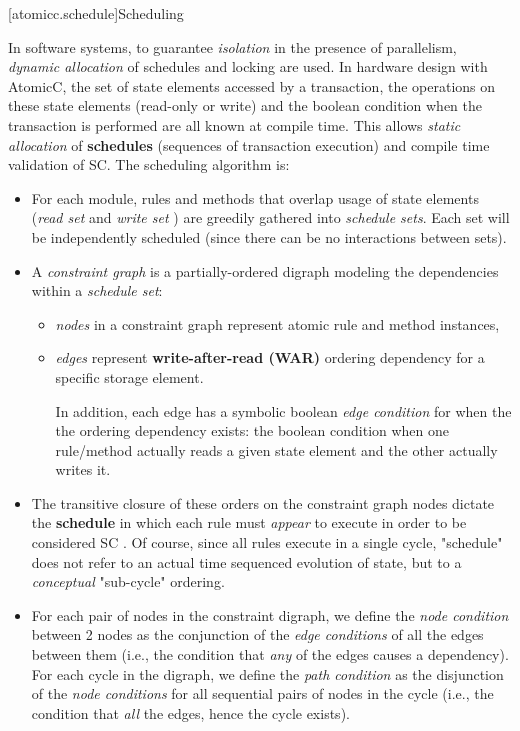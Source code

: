 [atomicc.schedule]{Scheduling}

In software systems, to guarantee \textit{isolation} in the presence of
parallelism, \textit{dynamic allocation}\cite[p.~377]{GrayR93} of schedules
and locking\cite[Sec.~11.2]{OV11} are used.
In hardware design with AtomicC,
the set of state elements accessed by a transaction,
the operations on these state elements (read-only or write)
and the boolean condition when the transaction is performed
are all known at compile time.
This allows \textit{static allocation}\cite[Sec.~7.3.1]{GrayR93} of \textbf{schedules}
(sequences of transaction execution)
and compile time validation of SC.
\newline
The scheduling algorithm is:
\begin{itemize}
\item For each module, rules and methods that overlap usage of state elements
(\textit{read set} and \textit{write set}\cite[Sec.~10.1.2]{OV11} \cite{RosenkrantzSternsLewis})
are greedily gathered into \textit{schedule sets}.
Each set will be independently scheduled (since
there can be no interactions between sets).
\item A \textit{constraint graph} is a partially-ordered digraph modeling
the dependencies within a \textit{schedule set}:
\begin{itemize}
\item \textit{nodes} in a constraint graph represent atomic rule and method instances,
\item \textit{edges} represent \textbf{write-after-read (WAR)} ordering dependency
for a specific storage element\cite[Sec.~3]{Cain2003}.

In addition, each edge has a symbolic boolean \textit{edge condition} for when the
the ordering dependency exists: the boolean
condition when one rule/method actually reads a given state element
and the other actually writes it.
\end{itemize}

\item The transitive closure of these orders on the constraint graph nodes
dictate the \textbf{schedule} in which each rule must \textit{appear} to execute in
order to be considered SC
\cite[Sec.~11.1]{OV11}.
Of course, since all rules execute in a single cycle, "schedule" does not
refer to an actual time sequenced evolution of state,
but to a \textit{conceptual} "sub-cycle" ordering.

\item For each pair of nodes in the constraint digraph, we define the \textit{node condition}
between 2 nodes as the conjunction of the \textit{edge conditions} of all the edges between
them (i.e., the condition that \textit{any} of the edges causes a dependency).
For each cycle in the digraph, we define the \textit{path condition}
as the disjunction of the \textit{node conditions} for all sequential pairs of nodes
in the cycle (i.e., the condition that \textit{all} the edges, hence the cycle exists).


\end{itemize}
